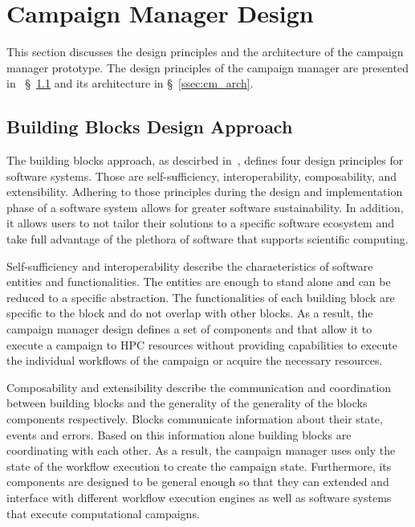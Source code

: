 \section{Campaign Manager Design}
\label{sec:cm_des}

This section discusses the design principles and the architecture of the campaign manager prototype.
The design principles of the campaign manager are presented in ~\S~\ref{ssec:building_blocks} and its architecture in \S~\ref{ssec:cm_arch}.

\subsection{Building Blocks Design Approach}
\label{ssec:building_blocks}
The building blocks approach, as descirbed in~\cite{turilli2019middleware}, defines four design principles for software systems.
Those are self-sufficiency, interoperability, composability, and extensibility.
Adhering to those principles during the design and implementation phase of a software system allows for greater software sustainability.
In addition, it allows users to not tailor their solutions to a specific software ecosystem and take full advantage of the plethora of software that supports scientific computing.

Self-sufficiency and interoperability describe the characteristics of software entities and functionalities.
The entities are enough to stand alone and can be reduced to a specific abstraction.
The functionalities of each building block are specific to the block and do not overlap with other blocks.
As a result, the campaign manager design defines a set of components and that allow it to execute a campaign to HPC resources without providing capabilities to execute the individual workflows of the campaign or acquire the necessary resources.

Composability and extensibility describe the communication and coordination between building blocks and the generality of the generality of the blocks components respectively.
Blocks communicate information about their state, events and errors.
Based on this information alone building blocks are coordinating with each other.
As a result, the campaign manager uses only the state of the workflow execution to create the campaign state.
Furthermore, its components are designed to be general enough so that they can extended and interface with different workflow execution engines as well as software systems that execute computational campaigns.

